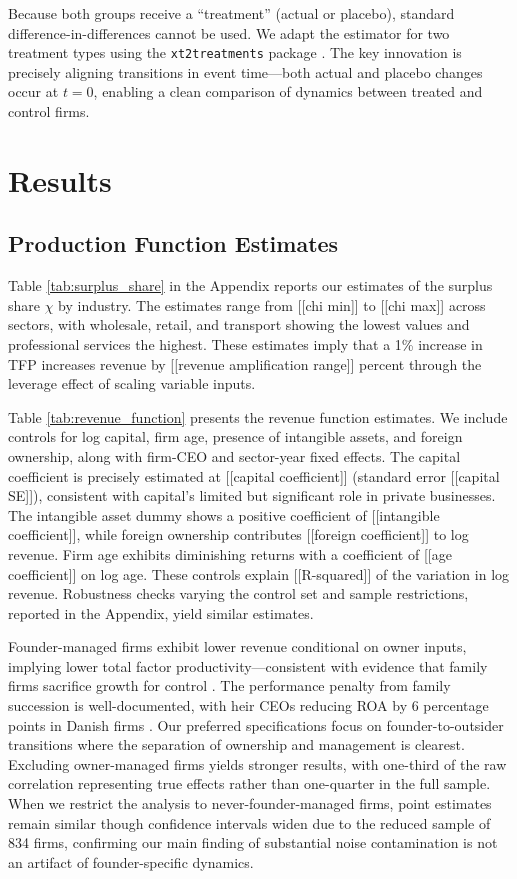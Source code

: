\documentclass[11pt,a4paper]{article}
\begin{document}
Because both groups receive a ``treatment'' (actual or placebo), standard difference-in-differences cannot be used. We adapt the \citet{Callaway2021JoLE} estimator for two treatment types using the \texttt{xt2treatments} package \citep{Koren2024xt2treatments}. The key innovation is precisely aligning transitions in event time—both actual and placebo changes occur at $t=0$, enabling a clean comparison of dynamics between treated and control firms.


\section{Results}

\subsection{Production Function Estimates}

Table \ref{tab:surplus_share} in the Appendix reports our estimates of the surplus share $\chi$ by industry. The estimates range from [[chi min]] to [[chi max]] across sectors, with wholesale, retail, and transport showing the lowest values and professional services the highest. These estimates imply that a 1\% increase in TFP increases revenue by [[revenue amplification range]] percent through the leverage effect of scaling variable inputs.

Table \ref{tab:revenue_function} presents the revenue function estimates. We include controls for log capital, firm age, presence of intangible assets, and foreign ownership, along with firm-CEO and sector-year fixed effects. The capital coefficient is precisely estimated at [[capital coefficient]] (standard error [[capital SE]]), consistent with capital's limited but significant role in private businesses. The intangible asset dummy shows a positive coefficient of [[intangible coefficient]], while foreign ownership contributes [[foreign coefficient]] to log revenue. Firm age exhibits diminishing returns with a coefficient of [[age coefficient]] on log age. These controls explain [[R-squared]] of the variation in log revenue. Robustness checks varying the control set and sample restrictions, reported in the Appendix, yield similar estimates.

Founder-managed firms exhibit lower revenue conditional on owner inputs, implying lower total factor productivity—consistent with evidence that family firms sacrifice growth for control \citep{bennedsen2007inside}. The performance penalty from family succession is well-documented, with heir CEOs reducing ROA by 6 percentage points in Danish firms \citep{bennedsen2007family}. Our preferred specifications focus on founder-to-outsider transitions where the separation of ownership and management is clearest. Excluding owner-managed firms yields stronger results, with one-third of the raw correlation representing true effects rather than one-quarter in the full sample. When we restrict the analysis to never-founder-managed firms, point estimates remain similar though confidence intervals widen due to the reduced sample of 834 firms, confirming our main finding of substantial noise contamination is not an artifact of founder-specific dynamics.
\end{document}
